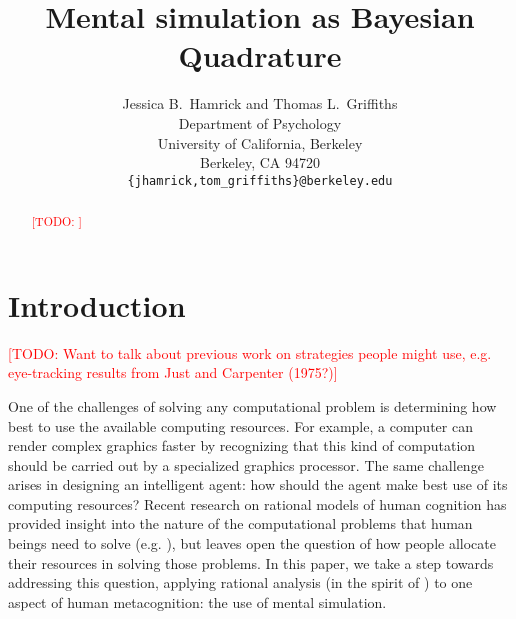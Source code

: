 \documentclass{article} %
\title{Mental simulation as Bayesian Quadrature}
\author{Jessica B.~Hamrick and Thomas L.~Griffiths\\
  Department of Psychology\\
  University of California, Berkeley\\
  Berkeley, CA 94720\\
  \texttt{\{jhamrick,tom\_griffiths\}@berkeley.edu}}
\newcommand{\TODO}[1]{\textcolor{red}{[TODO: #1]}}
\begin{document}
\maketitle

\begin{abstract}
\TODO{}
\end{abstract}


\section{Introduction}

\TODO{Want to talk about previous work on strategies people might use,
  e.g. eye-tracking results from Just and Carpenter (1975?)}



One of the challenges of solving any computational problem is
determining how best to use the available computing resources. For
example, a computer can render complex graphics faster by recognizing
that this kind of computation should be carried out by a specialized
graphics processor. The same challenge arises in designing an
intelligent agent: how should the agent make best use of its computing
resources? Recent research on rational models of human cognition has
provided insight into the nature of the computational problems that
human beings need to solve (e.g. \cite{something}), but leaves open
the question of how people allocate their resources in solving those
problems. In this paper, we take a step towards addressing this
question, applying rational analysis (in the spirit of
\cite{marr,anderson, shepard}) to one aspect of human metacognition:
the use of mental simulation.
\end{document}
